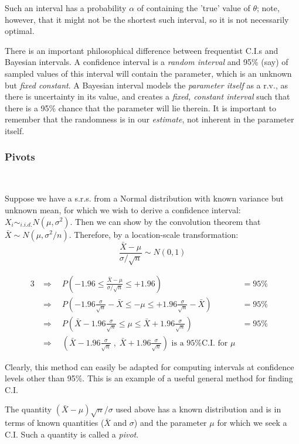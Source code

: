 \documentclass[12pt,a4paper]{article}
\begin{document}
Such an interval has a probability $\alpha$ of containing the 'true' value of $\theta$; note, however, that it might not be the shortest such interval, so it is not necessarily optimal.

There is an important philosophical difference between frequentist C.I.s and Bayesian intervals. A confidence interval is a \emph{random interval} and 95\% (say) of sampled values of this interval will contain the parameter, which is an unknown but \emph{fixed constant}. A Bayesian interval models the \emph{parameter itself} as a r.v., as there is uncertainty in its value, and creates a \emph{fixed, constant interval} such that there is a 95\% chance that the parameter will lie therein. It is important to remember that the randomness is in our \emph{estimate}, not inherent in the parameter itself.

\subsubsection{Pivots}$\;$

Suppose we have a s.r.s. from a Normal distribution with known variance but unknown mean, for which we wish to derive a confidence interval: $X_i \sim_{i.i.d.} N(\mu,\sigma^2)$. Then we can show by the convolution theorem that $\bar{X} \sim N(\mu,\sigma^2/n)$. Therefore, by a location-scale transformation:
$$\frac{\bar{X}-\mu}{\sigma/\sqrt{n}}\sim N(0,1)$$

\begin{alignat*}{3}
&\Rightarrow\quad P\left(-1.96 \leq \frac{\bar{X}-\mu}{\sigma/\sqrt{n}} \leq +1.96\right) &= 95\%\\
&\Rightarrow\quad P\left(-1.96\frac{\sigma}{\sqrt{n}} -\bar{X} \leq -\mu \leq +1.96\frac{\sigma}{\sqrt{n}} - \bar{X}\right) &= 95\%\\
&\Rightarrow\quad P\left(\bar{X}-1.96\frac{\sigma}{\sqrt{n}} \leq \mu \leq \bar{X} +1.96\frac{\sigma}{\sqrt{n}}\right) &= 95\%\\
&\Rightarrow\quad \left(\bar{X}-1.96\frac{\sigma}{\sqrt{n}}\; ,\;\bar{X}+1.96\frac{\sigma}{\sqrt{n}}\right) \mbox{ is a 95\% C.I. for $\mu$} & &
\end{alignat*}

Clearly, this method can easily be adapted for computing intervals at confidence levels other than 95\%. This is an example of a useful general method for finding C.I.

The quantity $(\bar{X}-\mu)\sqrt{n}/\sigma$ used above has a known distribution and is in terms of known quantities ($\bar{X}$ and $\sigma$) and the parameter $\mu$ for which we seek a C.I. Such a quantity is called a \emph{pivot}.\par\vspace{1cm}
\end{document}

